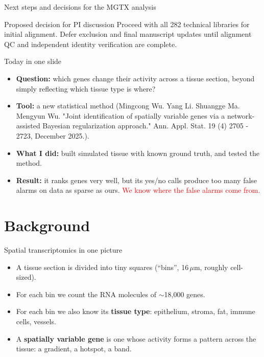 \documentclass[10pt,aspectratio=169]{beamer}
\begin{document}
\begin{frame}{Next steps and decisions for the MGTX analysis}
\begin{enumerate}
	\end{enumerate}
	
	\begin{block}{Proposed decision for PI discussion}
		Proceed with all 282 technical libraries for initial alignment.
		Defer exclusion and final manuscript updates until
		alignment QC and independent identity verification are complete.
	\end{block}
	
\end{frame}








\begin{frame}{Today in one slide}
  \begin{itemize}
    \item \textbf{Question:} which genes change their activity across a tissue section, beyond simply
          reflecting which tissue type is where?
    \item \textbf{Tool:} a new statistical method (Mingcong Wu. Yang Li. Shuangge Ma. Mengyun Wu. "Joint identification of spatially variable genes via a network-assisted Bayesian regularization approach." Ann. Appl. Stat. 19 (4) 2705 - 2723, December 2025.).
    \item \textbf{What I did:} built simulated tissue with known ground truth, and tested the method.
    \item \textbf{Result:} it ranks genes very well, but its yes/no calls produce too many false alarms
          on data as sparse as ours. \textcolor{red}{We know where the false alarms come from.}
  \end{itemize}
\end{frame}

\section{Background}

\begin{frame}{Spatial transcriptomics in one picture}
  \begin{itemize}
    \item A tissue section is divided into tiny squares (``bins'', 16\,$\mu$m, roughly cell-sized).
    \item For each bin we count the RNA molecules of $\sim$18{,}000 genes.
    \item For each bin we also know its \textbf{tissue type}: epithelium, stroma, fat, immune cells, vessels.
    \item A \textbf{spatially variable gene} is one whose activity forms a pattern across the tissue:
          a gradient, a hotspot, a band.
  \end{itemize}
\end{frame}
\end{document}
